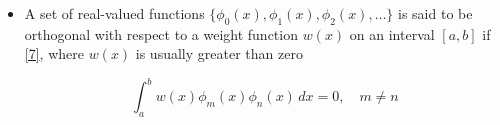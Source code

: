 \documentclass[12pt]{article}
\begin{document}
\begin{itemize}
  \item A set of real-valued functions $\{\phi_0(x),\phi_1(x),\phi_2(x),\dots\}$ is said to be orthogonal with respect to a weight function $w(x)$ on an interval $[a,b]$ if \eqref{7}, where $w(x)$ is usually greater than zero

    \begin{equation}
      \int_a^bw(x)\phi_m(x)\phi_n(x)\,dx=0,\,\,\,\,\,\,m\neq n 
      \label{7}
    \end{equation}

\end{itemize}
\end{document}
